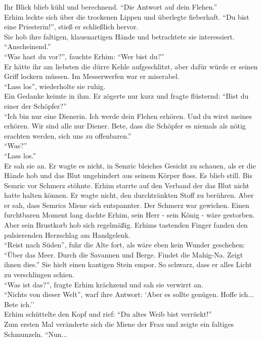 Ihr Blick blieb kühl und berechnend. ``Die Antwort auf dein Flehen.''\\
Erhim leckte sich über die trockenen Lippen und überlegte fieberhaft. ``Du bist eine Priesterin!'', 
stieß er schließlich hervor.\\
Sie hob ihre faltigen, klauenartigen Hände und betrachtete sie interessiert. ``Anscheinend.''\\
``Was hast du vor?'', fauchte Erhim: ``Wer bist du?''\\
Er hätte ihr am liebsten die dürre Kehle aufgeschlitzt, aber dafür würde er seinen Griff lockern 
müssen. Im Messerwerfen war er miserabel.\\
``Lass los'', wiederholte sie ruhig.\\
Ein Gedanke keimte in ihm. Er zögerte nur kurz und fragte flüsternd: ``Bist du einer der 
Schöpfer?''\\
``Ich bin nur eine Dienerin. Ich werde dein Flehen erhören. Und du wirst meines erhören. Wir sind 
alle nur Diener. Bete, dass die Schöpfer es niemals als nötig erachten werden, sich uns zu 
offenbaren.''\\
``Was?''\\
``Lass los.''\\
Er sah sie an. Er wagte es nicht, in Semric bleiches Gesicht zu schauen, als er die Hände hob und 
das Blut ungehindert aus seinem Körper floss. Es blieb still. Bis Semric vor Schmerz stöhnte. 
Erhim starrte auf den Verband der das Blut nicht hatte halten können. Er wagte nicht, den 
durchtränkten Stoff zu berühren. Aber er sah, dass Semrics Miene sich entspannter. Der Schmerz war 
gewichen. Einen furchtbaren Moment lang dachte Erhim, sein Herr - sein König - wäre gestorben. Aber 
sein Brustkorb hob sich regelmäßig. Erhims tastenden Finger fanden den pulsierenden Herzschlag 
am Handgelenk.\\
``Reist nach Süden'', fuhr die Alte fort, als wäre eben kein Wunder geschehen: ``Über das Meer. 
Durch die Savannen und Berge. Findet die Mahig-Na. Zeigt ihnen dies.'' Sie hielt einen kantigen 
Stein empor. So schwarz, dass er alles Licht zu verschlingen schien.\\
``Was ist das?'', fragte Erhim krächzend und sah sie verwirrt an.\\
``Nichts von dieser Welt'', warf ihre Antwort: `Aber es sollte genügen. Hoffe ich... Bete ich.''\\
Erhim schüttelte den Kopf und rief: ``Du altes Weib bist verrückt!''\\
Zum ersten Mal veränderte sich die Miene der Frau und zeigte ein faltiges Schmunzeln. ``Nun... 
